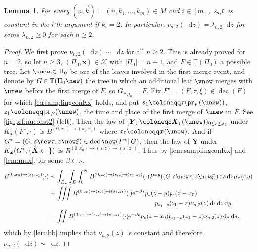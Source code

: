 \documentclass[reqno,draft]{amsart}
\numberwithin{equation}{section}
\theoremstyle{plain}
\newtheorem{lemma}[theorem]{Lemma}
\theoremstyle{remark}
\newcommand{\R}{\mathbb{R}} %
\newcommand*\diff{\mathop{}\!\mathrm{d}}
\newcommand{\e}{\mathrm{e}}
\DeclareMathOperator{\pr}{pr}
\newcommand{\fpart}{\Pi} %
\newcommand{\mergers}{M}
\DeclareMathOperator{\dcb}{dec}
\newcommand{\la}{\beta} %
\newcommand{\gnk}{\nu_{n,\smash{\vec{k}}}}
\newcommand{\rs}[1]{\accentset{\circ}{#1}} %
\newcommand{\rsto}[1]{\mathord\downarrow_{#1}}
\begin{document}
\begin{lemma}\label{lem:nuconst2}
    For every $(n,\vec{k}) = (n,k_1, \ldots ,k_m)\in \mergers$ and $i\in [m]$, $\gnk$ is constant in the $i$'th argument if $k_i = 2$. In particular, $\nu_{n,2}(\diff z) = \lambda_{n,2}\diff z$ for some $\lambda_{n,2}\ge 0$ for each $n \ge 2$.
\end{lemma}
\begin{proof}
    We first prove $\nu_{n,2}(\diff z) \sim \diff z$ for all $n \ge 2$. This is already proved for $n = 2$, so let $n \ge 3$, $(\fpart_0,\boldsymbol x)\in \mathcal{X}$ with $|\fpart_0| = n-1$, and $F\in \mathbb{T}(\fpart_0)$ a possible tree. Let $\unew \in \fpart_0$ be one of the leaves involved in the first merge event, and denote by $G \in \mathbb{T}(\fpart_0\new)$ the tree in which an additional leaf $\vnew$ merges with $\unew$ before the first merge of $F$, so $G\rsto{\fpart_0} = F$. Fix $F^\star=(F,\tau,\xi) \in \dcb(F)$ for which \cref{eq:samplingconKx} holds, and put $s_1 \coloneqq \tau(\pr_F(\unew))$, $z_1 \coloneqq \pr_F(\unew)$, the time and place of the first merge of $\unew$ in $F$. See \cref{fig:prf:nuconst2} (left). Then the law of $(\boldsymbol Y_r \coloneqq \boldsymbol X_{r}(\unew))_{0\le r \le s_1}$ under $K_{\boldsymbol x}(F^\star,\cdot )$ is $B^{(0,x_0)\to(s_1,z_1)}$ where $x_0 \coloneqq \boldsymbol x(\unew)$.
    And if $G^\star=(G,s\new\tau,z\new\xi)\in \dcb\new(F^\star \,\vert\,G)$, then the law of $\boldsymbol Y$ under $K_{\boldsymbol x}(G^\star,\{\rs{\boldsymbol X}\in\cdot \})$ is $B^{(0,x_0)\to(s,z)\to(s_1,z_1)}$. Thus by \cref{lem:samplingconKx} and \cref{lem:mux}, for some $\la\in \R$,
    \begin{align*}
        B^{(0,x_0)\to(s_1,z_1)}(\cdot )
        &\sim \int_{E_{\boldsymbol x}} \int_E \int_{0}^{s_1} B^{(0,x_0)\to(s,z)\to(s_1,z_1)}(\cdot ) P^{\boldsymbol x y}((G,s\new\tau,z\new\xi)) \diff s \diff z \mu_{\boldsymbol x}(\diff y)\\
        &\sim \iiint B^{(0,x_0)\to(s,z)\to(s_1,z_1)}(\cdot ) \e^{-\la s} p_s(z-y) p_s(z-x_0) \\[-5pt]
        &\hspace{6cm} p_{s_1-s}(z_1-z) \nu_{n,2}(z) \diff s\diff z\diff y\\
        &= \iint B^{(0,x_0)\to(s,z)\to(s_1,z_1)}(\cdot ) \e^{-\la s} p_s(z-x_0) p_{s_1-s}(z_1-z) \nu_{n,2}(z) \diff z \diff s,
    \end{align*}
    which by \cref{lem:bb} implies that $\nu_{n,2}(z)$ is constant and therefore $\nu_{n,2}(\diff z) \sim \diff z$.


\end{proof}
\end{document}
